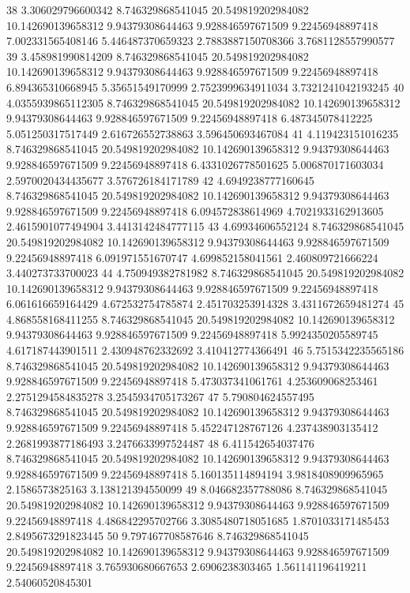 {38 3.306029796600342 8.746329868541045 20.549819202984082 10.142690139658312 9.94379308644463 9.928846597671509 9.22456948897418 7.002331565408146 5.446487370659323 2.7883887150708366 3.7681128557990577
39 3.458981990814209 8.746329868541045 20.549819202984082 10.142690139658312 9.94379308644463 9.928846597671509 9.22456948897418 6.894365310668945 5.35651549170999 2.7523999634911034 3.7321241042193245
40 4.0355939865112305 8.746329868541045 20.549819202984082 10.142690139658312 9.94379308644463 9.928846597671509 9.22456948897418 6.487345078412225 5.051250317517449 2.616726552738863 3.596450693467084
41 4.119423151016235 8.746329868541045 20.549819202984082 10.142690139658312 9.94379308644463 9.928846597671509 9.22456948897418 6.4331026778501625 5.006870171603034 2.5970020434435677 3.576726184171789
42 4.6949238777160645 8.746329868541045 20.549819202984082 10.142690139658312 9.94379308644463 9.928846597671509 9.22456948897418 6.094572838614969 4.7021933162913605 2.4615901077494904 3.4413142484777115
43 4.69934606552124 8.746329868541045 20.549819202984082 10.142690139658312 9.94379308644463 9.928846597671509 9.22456948897418 6.091971551670747 4.699852158041561 2.460809721666224 3.440273733700023
44 4.750949382781982 8.746329868541045 20.549819202984082 10.142690139658312 9.94379308644463 9.928846597671509 9.22456948897418 6.061616659164429 4.672532754785874 2.451703253914328 3.4311672659481274
45 4.868558168411255 8.746329868541045 20.549819202984082 10.142690139658312 9.94379308644463 9.928846597671509 9.22456948897418 5.9924350205589745 4.617187443901511 2.430948762332692 3.410412774366491
46 5.7515342235565186 8.746329868541045 20.549819202984082 10.142690139658312 9.94379308644463 9.928846597671509 9.22456948897418 5.473037341061761 4.253609068253461 2.2751294584835278 3.2545934705173267
47 5.790804624557495 8.746329868541045 20.549819202984082 10.142690139658312 9.94379308644463 9.928846597671509 9.22456948897418 5.452247128767126 4.237438903135412 2.2681993877186493 3.2476633997524487
48 6.411542654037476 8.746329868541045 20.549819202984082 10.142690139658312 9.94379308644463 9.928846597671509 9.22456948897418 5.160135114894194 3.9818408909965965 2.1586573825163 3.138121394550099
49 8.046682357788086 8.746329868541045 20.549819202984082 10.142690139658312 9.94379308644463 9.928846597671509 9.22456948897418 4.486842295702766 3.3085480718051685 1.8701033171485453 2.8495673291823445
50 9.797467708587646 8.746329868541045 20.549819202984082 10.142690139658312 9.94379308644463 9.928846597671509 9.22456948897418 3.765930680667653 2.6906238303465 1.561141196419211 2.54060520845301
}
